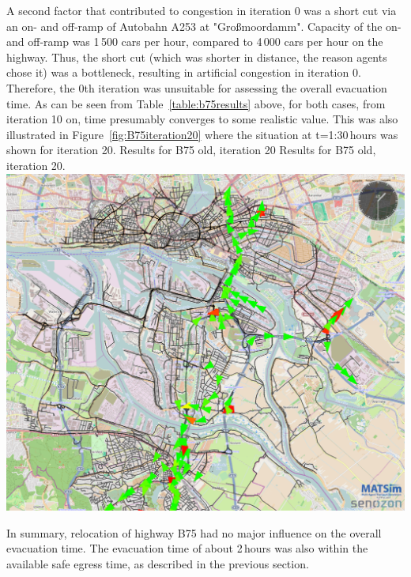 {}
%
A second factor that contributed to congestion in iteration 0 was a short cut via an on- and off-ramp of Autobahn A253 at "Gro{\ss}moordamm". Capacity of the on- and off-ramp was 1\,500 cars per hour, compared to 4\,000 cars per hour on the highway. Thus, the short cut (which was shorter in distance, the reason agents chose it) was a bottleneck, resulting in artificial congestion in iteration 0.
Therefore, the 0th iteration was unsuitable for assessing the overall evacuation time. As can be seen from Table~\ref{table:b75results} above, for both cases, from iteration 10 on, time presumably converges to some realistic value. This was also illustrated in Figure~\ref{fig:B75iteration20} where the situation at t=1:30\,hours was shown for iteration 20.
%
\createfigure%
{Results for B75 old, iteration 20}%
{Results for B75 old, iteration 20.}%
{\label{fig:B75iteration20}}%
{\includegraphics[width=0.7\linewidth]{using/figures/B75iteration20}}%
{}

In summary, relocation of highway B75 had no major influence on the overall evacuation time. The evacuation time of about 2\,hours was also within the available safe egress time, as described in the previous section. 

